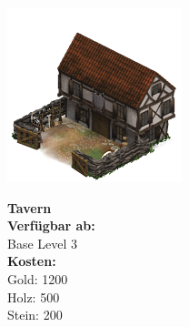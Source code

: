 \documentclass{scrartcl}
\begin{document}
\begin{minipage}{0.3\textwidth}
	\includegraphics[width=\textwidth]{imgTavern.png}
\end{minipage}
\hfill
\begin{minipage}{0.5\textwidth}
	\textbf{Tavern}\\
	
	\textbf{Verfügbar ab: }\\ Base Level 3\\
	\textbf{Kosten:
	}\\
	Gold: 1200 \\
	Holz: 500\\
	Stein: 200\\
	
\end{minipage}
\end{document}
